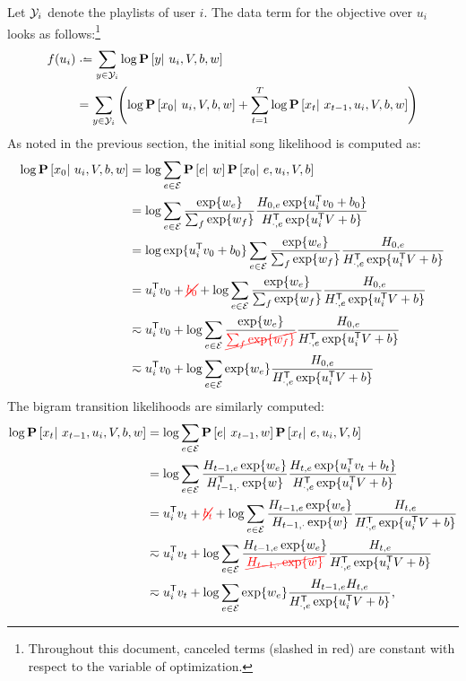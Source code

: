 \documentclass{article}
\newcommand{\ccancel}[2][black]{\color{#1}\cancel{#2}\normalcolor}
\def\E{\ensuremath{\mathcal{E}}}
\begin{document}
Let $\mathcal{Y}_i$ denote the playlists of user $i$. The data term for the objective over $u_i$ looks as follows:\footnote{Throughout this document, canceled terms (slashed in red) are 
constant with respect to the variable of optimization.}
\begin{align}
f(u_i) &\defeq \sum_{y \in \Y_i} \log\P\left[y\given u_i, V, b, w\right]\notag\\
&= \sum_{y \in \Y_i}\left( \log \P\left[x_0 \given u_i, V, b, w \right] + \sum_{t=1}^T \log \P\left[x_t \given x_{t-1}, u_i, V, b, w \right] \right)\label{eq:ustep:obj}
\end{align}
As noted in the previous section, the initial song likelihood is computed as:
\begin{align}
\log\P\left[x_0 \given u_i, V, b, w\right] &= \log\sum_{e\in \E} \P\left[e\given w\right]\P\left[x_0 \given e, u_i, V, b \right] \notag\\
&= \log\sum_{e\in \E} \frac{\exp\{ w_e\}}{\sum_f \exp\{w_f\}} \frac{H_{0, e} \exp\{u_i\trans v_0 + b_0 \} }{H_{\cdot, e}\trans \exp\{u_i\trans V + b \} }\notag\\
&= \log \exp\{u_i\trans v_0 + b_0 \} \sum_{e \in \E} \frac{\exp\{ w_e \}}{\sum_f \exp\{w_f\}}\frac{ H_{0, e} }{H_{\cdot, e}\trans \exp\{u_i\trans V + b \} }\notag\\
&= u_i\trans v_0 + \ccancel[red]{b_0} + \log \sum_{e\in \E}\frac{\exp\{w_e\}}{\sum_f \exp\{w_f\}}\frac{ H_{0, e}}{H_{\cdot, e}\trans \exp\{u_i\trans V + b \}}\notag\\
&\eqsim u_i\trans v_0 + \log \sum_{e\in \E}\frac{\exp\{w_e\}}{\ccancel[red]{\sum_f \exp\{w_f\}}}\frac{ H_{0, e}}{H_{\cdot, e}\trans \exp\{u_i\trans V + b \}}\notag\\%
&\eqsim u_i\trans v_0 + \log \sum_{e\in \E}\exp\{w_e\}\frac{ H_{0, e}}{H_{\cdot, e}\trans \exp\{u_i\trans V + b \}}\label{eq:ustep:initial}
\end{align}
The bigram transition likelihoods are similarly computed:
\begin{align}
\log\P\left[x_t \given x_{t-1}, u_i, V, b, w\right] &= \log\sum_{e\in \E} \P\left[e \given x_{t-1}, w \right]\P\left[x_t \given e, u_i, V, b \right]\notag\\
&= \log\sum_{e\in \E} \frac{H_{t-1,e} \exp\{w_e\} }{H_{t-1,\cdot}\trans \exp\{w\}} \frac{H_{t,e} \exp\{u_i\trans v_t + b_t \} }{H_{\cdot,e}\trans \exp\{u_i\trans V + b \} }\notag\\
&= u_i\trans v_t + \ccancel[red]{b_t} + \log\sum_{e\in \E} \frac{H_{t-1,e}\exp\{w_e\} }{H_{t-1,\cdot}\exp\{w\}}\frac{H_{t, e}}{H_{\cdot,e}\trans \exp\{u_i\trans V + b \} }\notag\\
&\eqsim u_i\trans v_t + \log\sum_{e\in \E} \frac{H_{t-1,e} \exp\{w_e\}}{\ccancel[red]{H_{t-1,\cdot} \exp\{w\} }}\frac{ H_{t,e} }{H_{\cdot,e}\trans \exp\{u_i\trans V + b \} }\notag\\
&\eqsim u_i\trans v_t + \log\sum_{e\in \E} \exp\{w_e\} \frac{H_{t-1,e} H_{t,e} }{H_{\cdot,e}\trans \exp\{u_i\trans V + b \} },\label{eq:ustep:bigram}
\end{align}
\end{document}
